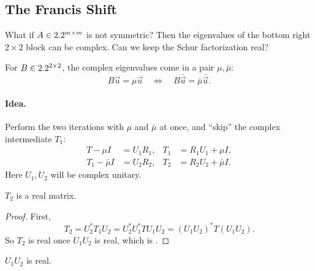 \subsection{The Francis Shift}
\label{sec:francis}

What if $A \in 2.2^{m \times m}$ is not symmetric? Then the eigenvalues of the bottom right $2 \times 2$ block can be complex. Can we keep the Schur factorization real?

For $B \in 2.2^{2 \times 2}$, the complex eigenvalues come in a pair $\mu, \bar{\mu}$:
\begin{equation}
  B\vec{u} = \mu\vec{u}
  \quad\Longleftrightarrow\quad
  B\bar{\vec{u}} = \bar{\mu}\bar{\vec{u}}.
\end{equation}

\paragraph{Idea.} Perform the two iterations with $\mu$ and $\bar{\mu}$ at once, and ``skip'' the complex intermediate $T_1$:
\begin{equation}
  \begin{aligned}
    T - \mu I &= U_1R_1, & T_1 &= R_1U_1 + \mu I, \\
    T_1 - \bar{\mu}I &= U_2R_2, & T_2 &= R_2U_2 + \bar{\mu}I.
  \end{aligned}
\end{equation}
Here $U_1, U_2$ will be complex unitary.

\begin{proposition}
  \label{prop:francis-t2-real}
  $T_2$ is a real matrix.
\end{proposition}

\begin{proof}
  First,
  \begin{equation}
    T_2 = U_2^\ast T_1U_2 = U_2^\ast U_1^\ast TU_1U_2 = (U_1U_2)^\ast T(U_1U_2).
  \end{equation}
  So $T_2$ is real once $U_1U_2$ is real, which is .
\end{proof}

\begin{lemma}
  \label{lem:francis-u-real}
  $U_1U_2$ is real.
\end{lemma}


